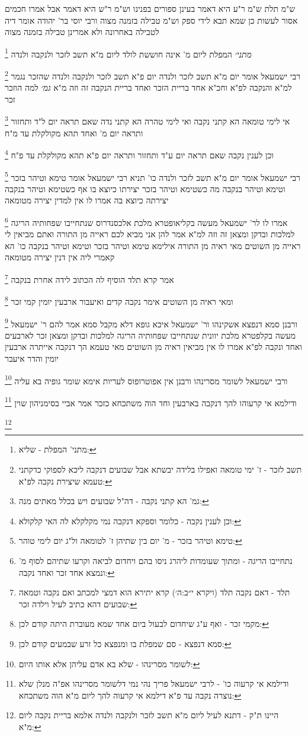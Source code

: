 \documentclass[12pt, openany]{book}
\newcommand{\footnotecomment}[1]{
	\renewcommand\thefootnote{}
	\footnote{#1}}
\newcommand{\commenta}[1]{\footnotecomment{#1}}
\begin{document}
{{ש"מ תלת ש"מ ר"ע היא דאמר בעינן ספורים בפנינו 
וש"מ ר"ש היא דאמר אבל אמרו חכמים אסור לעשות כן שמא תבא לידי ספק 
וש"מ טבילה בזמנה מצוה ורבי יוסי בר' יהודה אומר דיה לטבילה באחרונה ולא אמרינן טבילה בזמנה מצוה
\commenta{מתני' המפלת - שליא:}
{\large\emph{מתני׳}} המפלת ליום מ' אינה חוששת לולד ליום מ"א תשב לזכר ולנקבה ולנדה
\commenta{תשב לזכר - ז' ימי טומאה ואפילו בלידה יבשתא אבל שבועים דנקבה ליכא לספוקי כדקתני טעמא שיצירת נקבה לפ"א:}
רבי ישמעאל אומר יום מ"א תשב לזכר ולנדה יום פ"א תשב לזכר ולנקבה ולנדה שהזכר נגמר למ"א והנקבה לפ"א וחכ"א אחד בריית הזכר ואחד בריית הנקבה זה וזה מ"א
{\large\emph{גמ׳}} למה הוזכר זכר
\commenta{גמ' הא קתני נקבה - דה"ל שבועים ויש בכלל מאתים מנה:}
אי לימי טומאה הא קתני נקבה ואי לימי טהרה
הא קתני נדה 
שאם תראה יום ל"ד ותחזור ותראה יום מ' ואחד תהא מקולקלת עד מ"ח 
\commenta{וכן לענין נקבה - כלומר וספקא דנקבה נמי מקלקלא לה האי קלקולא:}
וכן לענין נקבה שאם תראה יום ע"ד ותחזור ותראה יום פ"א תהא מקולקלת עד פ"ח
\commenta{טימא וטיהר בזכר - מ' יום בין שתיהן ז' לטומאה ול"ג יום לימי טוהר:}
רבי ישמעאל אומר יום מ"א תשב לזכר ולנדה כו' תניא רבי ישמעאל אומר טימא וטיהר בזכר וטימא וטיהר בנקבה
מה כשטימא וטיהר בזכר יצירתו כיוצא בו אף כשטימא וטיהר בנקבה יצירתה כיוצא בה אמרו לו אין למדין יצירה מטומאה 
\commenta{נתחייבו הריגה - ומתוך שעומדות ליהרג ניסו בהם ויחדום לביאה וקרעו שתיהם לסוף מ' ונמצא אחד זכר ואחד נקבה:}
אמרו לו לר' ישמעאל מעשה בקליאופטרא מלכת אלכסנדרוס שנתחייבו שפחותיה הריגה למלכות ובדקן ומצאן זה וזה למ"א אמר להן אני מביא לכם ראייה מן התורה ואתם מביאין לי ראייה מן השוטים 
מאי ראיה מן התורה אילימא טימא וטיהר בזכר וטימא וטיהר בנקבה כו' הא קאמרי ליה אין דנין יצירה מטומאה 
\commenta{תלד - דאם נקבה תלד (ויקרא י״ב:ה׳) קרא יתירא הוא דמצי למכתב ואם נקבה וטמאה שבועים דהא כתיב לעיל וילדה זכר:}
אמר קרא תלד הוסיף לה הכתוב לידה אחרת בנקבה 
\commenta{מקמי זכר - ואף ע"ג שיחדום לבעול ביום אחד שמא מעוברת היתה קודם לכן:}
ומאי ראיה מן השוטים אימר נקבה קדים ואיעבור ארבעין יומין קמי זכר 
\commenta{סמא דנפצא - סם שמפלת בו ומנפצא כל זרע שבמעים קודם לכן:}
ורבנן סמא דנפצא אשקינהו ור' ישמעאל איכא גופא דלא מקבל סמא
אמר להם ר' ישמעאל מעשה בקלפטרא מלכת יוונית שנתחייבו שפחותיה הריגה למלכות ובדקן ומצאן זכר לארבעים ואחד ונקבה לפ"א אמרו לו אין מביאין ראיה מן השוטים 
מאי טעמא הך דנקבה אייתרה ארבעין יומין והדר איעבר 
\commenta{לשומר מסרינהו - שלא בא אדם עליהן אלא אותו היום:}
ורבי ישמעאל לשומר מסרינהו ורבנן אין אפוטרופוס לעריות אימא שומר גופיה בא עליה 
\commenta{ודילמא אי קרעוה כו' - לרבי ישמעאל פריך נהי נמי דלשומר מסרינהו אפ"ה מנלן שלא נוצרה נקבה עד פ"א דילמא אי קרעוה להך ליום מ"א הוה משתכחא:}
ודילמא אי קרעוהו להך דנקבה בארבעין וחד הוה משתכחא כזכר אמר אביי בסימניהון שוין
\commenta{היינו ת"ק - דתנא לעיל ליום מ"א תשב לזכר ולנקבה ולנדה אלמא בריית נקבה ליום מ"א:}
}}
\end{document}
